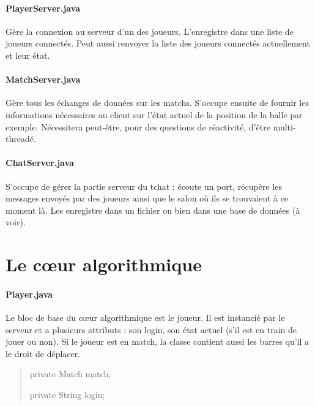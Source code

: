 \documentclass[a4paper,12pt]{report}
\begin{document}
\paragraph{PlayerServer.java}
Gère la connexion au serveur d'un des joueurs. L'enregistre dans une liste de joueurs connectés. Peut aussi renvoyer la liste des joueurs connectés actuellement et leur état.
\paragraph{MatchServer.java}
Gère tous les échanges de données sur les matchs. S'occupe ensuite de fournir les informations nécessaires au client sur l'état actuel de la position de la balle par exemple. Nécessitera peut-être, pour des questions de réactivité, d'être multi-threadé.
\paragraph{ChatServer.java}
S'occupe de gérer la partie serveur du tchat : écoute un port, récupère les messages envoyés par des joueurs ainsi que le salon où ils se trouvaient à ce moment là. Les enregistre dans un fichier ou bien dans une base de données (à voir).


\section{Le c\oe{}ur algorithmique}
\paragraph{Player.java}
Le bloc de base du c\oe{}ur algorithmique est le joueur. Il est instancié par le serveur et a plusieurs attributs : son login, son état actuel (s'il est en train de jouer ou non). Si le joueur est en match, la classe contient aussi les barres qu'il a le droit de déplacer.
\begin{quote}
	private Match match;
    
	private String login;
\end{quote}
\end{document}
